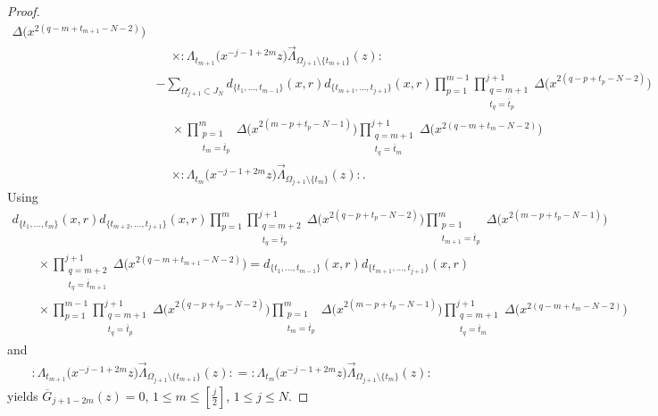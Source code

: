 \documentclass[pdftex]{sigma}
\numberwithin{equation}{section}
\begin{document}
\begin{proof}
\begin{align*}
\Delta\big(x^{2(q-m+t_{m+1}-N-2)}\big)
\\
&\phantom{-}\times{:}\Lambda_{t_{m+1}}\big(x^{-j-1+2m}z\big)
\overrightarrow{\Lambda}_{\Omega_{j+1}\setminus \{t_{m+1}\}}(z){:}
\\
&-\sum_{\Omega_{j+1}\subset J_N}\!\!\!
d_{\{t_1,\dots,t_{m-1}\}}(x,r) d_{\{t_{m+1},\dots,t_{j+1}\}}(x,r)
\prod_{p=1}^{m-1}\! \prod\limits_{\substack{q=m+1
\\t_q=\overline{t}_p}}^{j+1}\!\!\!\Delta\big(x^{2(q-p+t_p-N-2)}\big)
\\
&\phantom{-}\times\prod\limits_{\substack{p=1\\t_{m}=\overline{t}_p}}^m
\Delta\big(x^{2(m-p+t_p-N-1)}\big)\prod\limits_{\substack{q=m+1\\t_q=\overline{t}_{m}}}^{j+1}
\Delta\big(x^{2(q-m+t_{m}-N-2)}\big)
\\
&\phantom{-}\times{:}\Lambda_{t_{m}}\big(x^{-j-1+2m}z\big)
\overrightarrow{\Lambda}_{\Omega_{j+1}\setminus \{t_{m}\}}(z){:}.
\end{align*}
Using
\begin{gather*}
d_{\{t_1,\dots,t_m\}}(x,r) d_{\{t_{m+2},\dots,t_{j+1}\}}(x,r)
\prod_{p=1}^m \prod\limits_{\substack{q=m+2\\t_q=\overline{t}_p}}^{j+1}
\Delta\big(x^{2(q-p+t_p-N-2)}\big)
\prod\limits_{\substack{p=1\\t_{m+1}=\overline{t}_p}}^m
\Delta\big(x^{2(m-p+t_p-N-1)}\big)
\\ \qquad
{}\times\prod\limits_{\substack{q=m+2\\t_q=\overline{t}_{m+1}}}^{j+1}
\Delta\big(x^{2(q-m+t_{m+1}-N-2)}\big)
=d_{\{t_1,\dots,t_{m-1}\}}(x,r) d_{\{t_{m+1},\dots,t_{j+1}\}}(x,r)
\\ \qquad
{}\times
\prod_{p=1}^{m-1} \prod\limits_{\substack{q=m+1
\\t_q=\overline{t}_p}}^{j+1}\!
\Delta\big(x^{2(q-p+t_p-N-2)}\big)\!
\prod\limits_{\substack{p=1
\\t_{m}=\overline{t}_p}}^m\Delta\big(x^{2(m-p+t_p-N-1)}\big)
\prod\limits_{\substack{q=m+1\\t_q=\overline{t}_{m}}}^{j+1}
\Delta\big(x^{2(q-m+t_{m}-N-2)}\big)
\end{gather*}
and
\begin{gather*}
{:}\Lambda_{t_{m+1}}\big(x^{-j-1+2m}z\big)
\overrightarrow{\Lambda}_{\Omega_{j+1}\setminus \{t_{m+1}\}}(z){:}
={:}\Lambda_{t_{m}}\big(x^{-j-1+2m}z\big)
\overrightarrow{\Lambda}_{\Omega_{j+1}\setminus \{t_{m}\}}(z){:}
\end{gather*}
yields
$\overline{G}_{j+1-2m}(z)=0$, $1\leq m \leq [\frac{j}{2}]$, $1\leq j \leq N$.


\end{proof}
\end{document}
